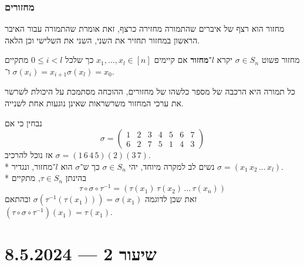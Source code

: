 \subsubsection{מחזורים}
מחזור הוא רצף של איברים שהתמורה מחזירה כרצף, זאת אומרת שהתמורה עבור האיבר הראשון במחזור תחזיר את השני, השני את השלישי וכן הלאה.
\begin{definition}
	מחזור פשוט $\sigma \in S_n$ יקרא \textbf{$l$־מחזור} אם קיימים $x_1, \hdots, x_l \in [n]$ כך שלכל $0 \le i < l$ מתקיים $\sigma(x_i) = x_{i + 1}$ ו־$\sigma(x_l) = x_0$.
\end{definition}
\begin{proposition}
	כל תמורה היא הרכבה של מספר כלשהו של מחזורים, ההוכחה מסתמכת על היכולת לשרשר את ערכי המחזור משרשראות שאינן נוגעות אחת לשנייה.
\end{proposition}
\begin{example}
	נבחין כי אם
	\[
		\sigma = \begin{pmatrix}
			1 & 2 & 3 & 4 & 5 & 6 & 7 \\
			6 & 2 & 7 & 5 & 1 & 4 & 3
		\end{pmatrix}
	\]
	אז נוכל להרכיב $\sigma = (1 \, 6 \, 4 \, 5)(2)(3 \, 7)$. \\*
	נשים לב למקרה מיוחד, יהי $\sigma \in S_n$ כך ש־$\sigma$ הוא $l$־מחזור, ונגדיר $\sigma = (x_1 \, x_2 \, \hdots \, x_l)$. \\*
	בהינתן $\tau \in S_n$, מתקיים
	\[
		\tau \circ \sigma \circ \tau^{-1} = (\tau(x_1) \, \tau(x_2) \, \hdots \, \tau(x_n))
	\]
	זאת שכן לדוגמה $\sigma(\tau^{-1}(\tau(x_1))) = \sigma(x_1)$ ובהתאם $(\tau \circ \sigma \circ \tau^{-1}) (x_1) = \tau(x_1)$.
\end{example}

\section{שיעור 2 --- 8.5.2024}

